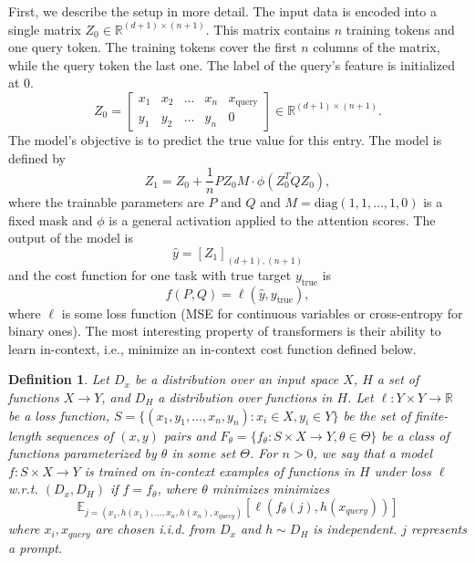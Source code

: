 \documentclass[a4paper,11pt]{article}
\newcommand{\1}{\mathbbm{1}}
\theoremstyle{plain}
\newtheorem{definition}{Definition}[section]
\begin{document}
First, we describe the setup in more detail. The input data is encoded into a single matrix $Z_0 \in \mathbb{R}^{(d+1) \times (n+1)}$. This matrix contains $n$ training tokens and one query token. The training tokens cover the first $n$ columns of the matrix, while the query token the last one. The label of the query's feature is initialized at $0$.
\begin{equation*}
    Z_0 = \begin{bmatrix}
        x_1 &x_2 &\dots &x_n &x_{\text{query}} \\ y_1 &y_2 &\dots &y_n &0
    \end{bmatrix} \in \mathbb{R}^{(d+1) \times (n+1)}.
\end{equation*}
The model's objective is to predict the true value for this entry.
The model is defined by 
$$
Z_{1} = Z_0 + \frac{1}{n} P Z_0 M \cdot \phi(Z_0^T Q Z_0),
$$ where the trainable parameters are $P$ and $Q$ and $M=\text{diag}(1,1,\dots,1,0)$ is a fixed mask and $\phi$ is a general activation applied to the attention scores. The output of the model is $$\hat{y} = [Z_1]_{(d+1),(n+1)}$$ and the cost function for one task with true target  $y_{\text{true}}$ is $$f(P,Q) = \ell(\hat{y},y_{\text{true}}),$$ where $\ell$ is some loss function (MSE for continuous variables or cross-entropy for binary ones). The most interesting property of transformers is their ability to learn in-context, i.e., minimize an in-context cost function defined below.

\begin{definition}
\label{def:in_context_learning}
\label{prop:transformers_in_context}
Let $D_x$ be a distribution over an input
space $X$, $H$ a set of functions $X \rightarrow Y$, and $D_H$ a distribution over functions in $H$.
Let $\ell : Y \times Y \rightarrow\mathbb{R}$ be a loss function, $S = \lbrace {(x_1, y_1, \dots , x_n, y_n) : x_i \in X , y_i \in Y} \rbrace$ be
the set of finite-length sequences of $(x, y)$ pairs and
$F_\theta = \lbrace f_\theta : S \times X \rightarrow Y, \theta \in \Theta \rbrace$
be a class of functions parameterized by $\theta$ in some set $\Theta$. For $n > 0$, we say that a model
$f : S \times X \rightarrow Y$ is trained on in-context examples of functions in $H$ under loss $\ell$ w.r.t.
$(D_x, D_H)$ if $f = f_\theta$, where $\theta$ minimizes
minimizes $$\mathbb{E}_{j=(x_1,h(x_1),\dots,x_n ,h(x_n ),x_{query})}
[\ell(f_\theta(j), h(x_{query}))]$$
where $x_i, x_{query}$ are chosen 
i.i.d. from $D_x$ and $h \sim D_H$ is independent. $j$ represents a prompt.
\end{definition}
\end{document}
